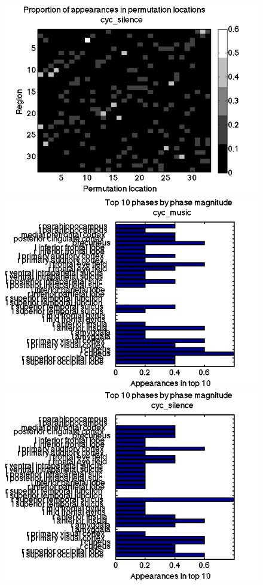 \documentclass[11pt]{article}
\begin{document}
\begin{figure}[H]
		\includegraphics[width=\w\linewidth]{pictures/dodPilots/cyc_silence_permLocationsgray.png}
		\includegraphics[width=\w\linewidth]{pictures/dodPilots/cyc_music_phaseHist.png}
		\includegraphics[width=\w\linewidth]{pictures/dodPilots/cyc_silence_phaseHist.png}
	\end{figure}
\end{document}
